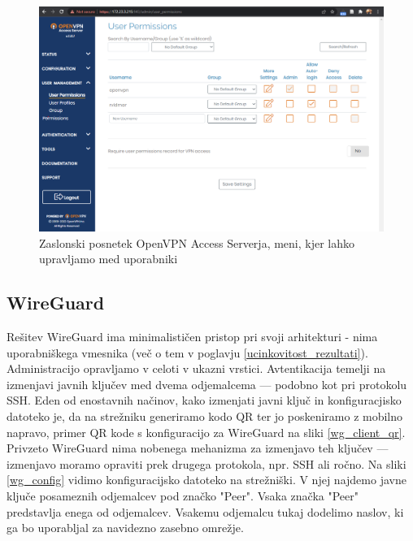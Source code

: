 \documentclass[a4paper, 12pt]{book}
\begin{document}
\begin{figure}[h]
\begin{center}
\includegraphics[width=1\textwidth]{fotografije/ovpnas_user_managment.png}
\end{center}
\caption{Zaslonski posnetek OpenVPN Access Serverja, meni, kjer lahko upravljamo med uporabniki \cite{rvidmar}}
\label{OvpnAS_usermanagment}
\end{figure}

\subsection{WireGuard}
Rešitev WireGuard ima minimalističen pristop pri svoji arhitekturi - nima uporabniškega vmesnika (več o tem v poglavju \ref{ucinkovitost_rezultati}). Administracijo opravljamo v celoti v ukazni vrstici. Avtentikacija temelji na izmenjavi javnih ključev med dvema odjemalcema --- podobno kot pri protokolu SSH. Eden od enostavnih načinov, kako izmenjati javni ključ in konfiguracjisko datoteko je, da na strežniku generiramo kodo QR ter jo poskeniramo z mobilno napravo, primer QR kode s konfiguracijo za WireGuard na sliki \ref{wg_client_qr}. Privzeto WireGuard nima nobenega mehanizma za izmenjavo teh ključev --- izmenjavo moramo opraviti prek drugega protokola, npr. SSH ali ročno. Na sliki \ref{wg_config} vidimo konfiguracijsko datoteko na strežniški. V njej najdemo javne ključe posameznih odjemalcev pod značko "Peer". Vsaka značka "Peer" predstavlja enega od odjemalcev. Vsakemu odjemalcu tukaj dodelimo naslov, ki ga bo uporabljal za navidezno zasebno omrežje.
\end{document}
